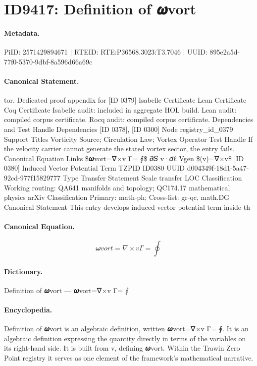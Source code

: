 \section*{ID9417: Definition of 𝝎vort}
\paragraph{Metadata.}
PiID: 2571429894671 | RTEID: RTE:P36568.3023:T3.7046 | UUID: 895e2a5d-77f0-5370-9dbf-8a596d66a69c

\paragraph{Canonical Statement.}
tor. Dedicated proof appendix for [ID 0379] Isabelle Certificate Lean Certificate Coq Certificate Isabelle audit: included in aggregate HOL build. Lean audit: compiled corpus certificate. Rocq audit: compiled corpus certificate. Dependencies and Test Handle Dependencies [ID 0378], [ID 0300] Node registry\_id\_0379 Support Titles Vorticity Source; Circulation Law; Vortex Operator Test Handle If the velocity carrier cannot generate the stated vortex sector, the entry fails. Canonical Equation Links \$𝝎vort=∇×v Γ= ∮\$ 𝜕𝑆 v·𝑑ℓ Vgen \$(v)=∇×v\$ [ID 0380] Induced Vector Potential Term TZPID ID0380 UUID d004349f-18d1-5a47-92cd-977f15829777 Type Transfer Statement Scale transfer LOC Classification Working routing: QA641 manifolds and topology; QC174.17 mathematical physics arXiv Classification Primary: math-ph; Cross-list: gr-qc, math.DG Canonical Statement This entry develops induced vector potential term inside th

\paragraph{Canonical Equation.}
\[
𝝎vort=∇×v Γ= ∮
\]

\paragraph{Dictionary.}
Definition of 𝝎vort — 𝝎vort=∇×v Γ= ∮

\paragraph{Encyclopedia.}
Definition of 𝝎vort is an algebraic definition, written 𝝎vort=∇×v Γ= ∮. It is an algebraic definition expressing the quantity directly in terms of the variables on its right-hand side. It is built from v, defining 𝝎vort. Within the Trawin Zero Point registry it serves as one element of the framework's mathematical narrative.
